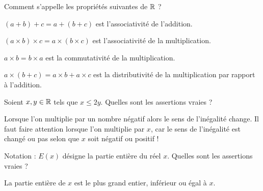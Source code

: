 \begin{question}
Comment s'appelle les propriétés suivantes de $\mathbb{R}$ ?
\begin{answers}



\end{answers}
\begin{explanations}
$(a+b)+c=a+(b+c)$ est l'associativité de l'addition.

$(a \times b)\times c=a \times (b \times c)$ est l'associativité de la multiplication.

$a \times b = b\times a$ est la commutativité de la multiplication.

$a \times (b+c) = a\times b + a \times c$ est la distributivité de la multiplication  par rapport à l'addition.
\end{explanations}
\end{question}


\begin{question}
Soient $x,y \in \mathbb{R}$ tels que $x \le 2y$.
Quelles sont les assertions vraies ?
\begin{answers}



\end{answers}
\begin{explanations}
Lorsque l'on multiplie par un nombre négatif alors le sens de l'inégalité change. Il faut faire attention lorsque l'on multiplie par $x$, car le sens de l'inégalité est changé ou pas selon que $x$ soit négatif ou positif !
\end{explanations}
\end{question}


\begin{question}
Notation : $E(x)$ désigne la partie entière du réel $x$.
Quelles sont les assertions vraies ?
\begin{answers}



\end{answers}
\begin{explanations}
La partie entière de $x$ est le plus grand entier, inférieur ou égal à $x$.
\end{explanations}
\end{question}



